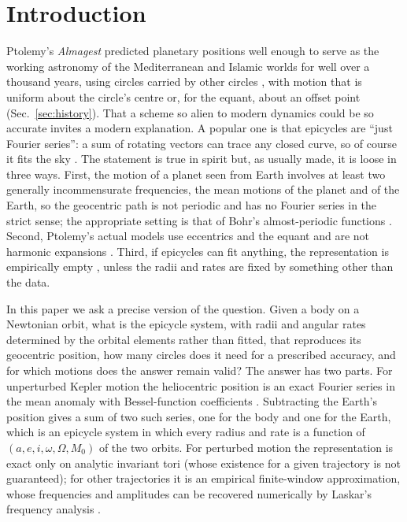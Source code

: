 \section{Introduction}
\label{sec:intro}

Ptolemy's \emph{Almagest} \cite{Toomer1998} predicted planetary positions
well enough to serve as the working astronomy of the Mediterranean
and Islamic worlds for well over a thousand years, using circles carried by other circles
\cite{Neugebauer1975,Evans1998}, with motion that is uniform about the circle's
centre or, for the equant, about an offset point (Sec.~\ref{sec:history}). That a scheme so alien to modern dynamics
could be so accurate invites a modern explanation. A popular one is that
epicycles are ``just Fourier series'': a sum of rotating
vectors can trace any closed curve, so of course it fits the sky
\cite{Hanson1960,Mathologer2018,3b1b2019,WikiDeferent}. The statement is
true in spirit but, as usually made, it is loose in three ways. First, the
motion of a planet seen from Earth involves at least two generally
incommensurate frequencies, the mean motions of the planet and of the Earth,
so the geocentric path is not periodic and has no Fourier series in the
strict sense; the appropriate setting is that of Bohr's almost-periodic
functions \cite{Bohr1925}. Second, Ptolemy's actual models use eccentrics
and the equant and are not harmonic expansions
\cite{Neugebauer1975,Evans1984}. Third, if epicycles can fit anything, the
representation is empirically empty \cite{Carman2010}, unless the radii and
rates are fixed by something other than the data.

In this paper we ask a precise version of the question. Given a body on a
Newtonian orbit, what is the epicycle system, with radii and angular rates
determined by the orbital elements rather than fitted, that reproduces its
geocentric position, how many circles does it need for a prescribed accuracy,
and for which motions does the answer remain valid? The answer has two
parts. For unperturbed Kepler motion the heliocentric position is an exact
Fourier series in the mean anomaly with Bessel-function coefficients
\cite{Dutka1995,Watson1944,MurrayDermott1999}. Subtracting the Earth's
position gives a sum of two such series, one for the body and one
for the Earth, which is an epicycle system in which every radius and rate is
a function of $(a,e,i,\omega,\Omega,M_0)$ of the two orbits. For perturbed
motion the representation is exact only on analytic invariant tori (whose
existence for a given trajectory is not guaranteed); for other trajectories it is
an empirical finite-window approximation, whose frequencies and amplitudes can be
recovered numerically by Laskar's frequency analysis
\cite{Laskar1990,Laskar1992,Laskar1999}.

